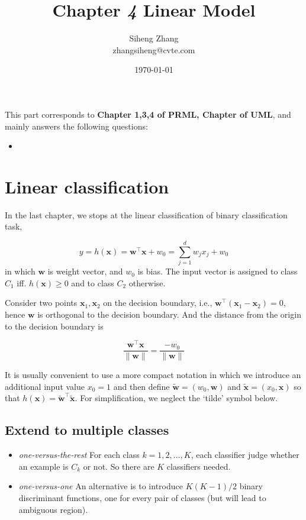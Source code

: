\documentclass{article}
\author{Siheng Zhang\\zhangsiheng@cvte.com}
\title{Chapter \textbf{\textit{4}} Linear Model}
\date{\today}
\begin{document}
\maketitle  

This part corresponds to \textbf{Chapter 1,3,4 of PRML, Chapter of UML}, and mainly answers the following questions:

\begin{itemize}
\item 
\end{itemize}

\tableofcontents
\newpage

\section{Linear classification}

	In the last chapter, we stops at the linear classification of binary classification task,
	
	\begin{equation}
	y=h(\mathbf{x})=\mathbf{w}^\top \mathbf{x} + w_0 = \sum_{j=1}^d w_j x_j + w_0
	\end{equation}
in which $\mathbf{w}$ is weight vector, and $w_0$ is bias. The input vector is assigned to class $C_1$ iff. $h(\mathbf{x})\geq 0$ and to class $C_2$ otherwise.

	Consider two points $\mathbf{x}_1,\mathbf{x}_2$ on the decision boundary, i.e., $\mathbf{w}^\top (\mathbf{x}_1 - \mathbf{x}_2) = 0$, hence $\mathbf{w}$ is orthogonal to the decision boundary. And the distance from the origin to the decision boundary is
	
	\begin{equation}
	\frac{\mathbf{w}^\top \mathbf{x}}{\|\mathbf{w}\|} = \frac{-w_0}{\|\mathbf{w}\|}
	\end{equation}
	
	It is usually convenient to use a more compact notation in which we introduce an additional input value $x_0 = 1$ and then define $\tilde{\mathbf{w}} = (w_0, \mathbf{w})$ and $\tilde{\mathbf{x}} = (x_0, \mathbf{x})$ so that $h(\mathbf{x}) = \tilde{\mathbf{w}}^\top \tilde{\mathbf{x}}$. For simplification, we neglect the `tilde' symbol below.
	
	\subsection{Extend to multiple classes}
	
	\begin{itemize}
	\item \textit{one-versus-the-rest} For each class $k=1,2,...,K$, each classifier judge whether an example is $C_k$ or not. So there are $K$ classifiers needed.
	\item \textit{one-versus-one} An alternative is to introduce $K(K-1)/2$ binary discriminant functions, one for every pair of classes (but will lead to ambiguous region).
	\end{itemize}
	
\end{document}
